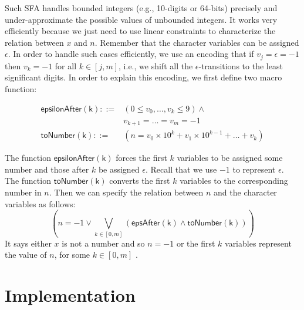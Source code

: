 \documentclass[sigplan,review,anonymous]{acmart}\settopmatter{printfolios=true,printccs=false,printacmref=false}
\begin{document}
Such SFA handles bounded integers (e.g., 10-digits or 64-bits) precisely and under-approximate the possible values of unbounded integers. It works very efficiently because we just need to use linear constraints to characterize the relation between $x$ and $n$. 
Remember that the character variables can be assigned $\epsilon$. In order to handle such cases efficiently, we use an encoding that if $v_j = \epsilon = -1$ then $v_k = -1$ for all $k\in [j,m]$, i.e., we shift all the $\epsilon$-transitions to the least significant digits. In order to explain this encoding, we first define two macro function:

$$\begin{array}{rl}
\mathsf{epsilonAfter(k)}::=& (0\leq v_0,\ldots, v_k\leq 9) \wedge\\
&v_{k+1}=\ldots =v_m = -1\\
\mathsf{toNumber(k)}::=& (n = v_0\times 10^{k} + v_1\times 10^{k-1} + \ldots + v_{k})
\end{array}
$$

The function $\mathsf{epsilonAfter(k)}$ forces the first $k$ variables to be assigned some number and those after $k$ be assigned $\epsilon$. Recall that we use $-1$ to represent $\epsilon$. The function $\mathsf{toNumber(k)}$ converts the first $k$ variables to the corresponding number in $n$.
Then we can specify the relation between $n$ and the character variables as follows:
$$(n=-1 \vee \bigvee_{k\in [0,m]} (\mathsf{epsAfter(k)} \wedge \mathsf{toNumber(k)} ) )$$
It says either $x$ is not a number and so $n=-1$ or the first $k$ variables represent the value of $n$, for some $k\in [0,m]$ .





\section{Implementation}




\end{document}
